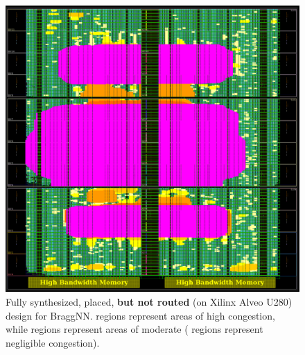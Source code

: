 \begin{figure}
	\includegraphics[width=\columnwidth]{figures/congestion_alveo.png}
	\caption{Fully synthesized, placed, \textbf{but not routed} (on Xilinx Alveo U280) design for BraggNN. \crule[violet]{0.25cm}{0.25cm} regions represent areas of high congestion, while \crule[orange]{0.25cm}{0.25cm} regions represent areas of moderate (\crule[green]{0.25cm}{0.25cm} regions represent negligible congestion).}\label{fig:congestion_alveo}
\end{figure}